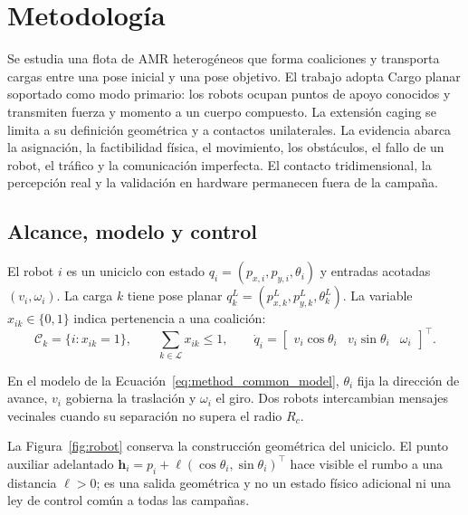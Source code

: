 \section{Metodología}
\label{sec:methodology}

Se estudia una flota de AMR heterogéneos que forma coaliciones y transporta
cargas entre una pose inicial y una pose objetivo. El trabajo adopta Cargo planar
soportado como modo primario: los robots ocupan puntos de apoyo conocidos y
transmiten fuerza y momento a un cuerpo compuesto. La extensión caging se limita
a su definición geométrica y a contactos unilaterales. La evidencia abarca la
asignación, la factibilidad física, el movimiento, los obstáculos, el fallo de un
robot, el tráfico y la comunicación imperfecta. El contacto tridimensional, la
percepción real y la validación en hardware permanecen fuera de la campaña.

\subsection{Alcance, modelo y control}
\label{sec:method_model_scope}

El robot \(i\) es un uniciclo con estado
\(q_i=(p_{x,i},p_{y,i},\theta_i)\) y entradas acotadas
\((v_i,\omega_i)\). La carga \(k\) tiene pose planar
\(q_k^L=(p_{x,k}^L,p_{y,k}^L,\theta_k^L)\). La variable
\(x_{ik}\in\{0,1\}\) indica pertenencia a una coalición:
\begin{equation}
    \mathcal C_k=\{i:x_{ik}=1\},\qquad
    \sum_{k\in\mathcal L}x_{ik}\leq1,\qquad
    \dot q_i=
    \begin{bmatrix}
        v_i\cos\theta_i & v_i\sin\theta_i & \omega_i
    \end{bmatrix}^{\!\top}.
    \label{eq:method_common_model}
\end{equation}

En el modelo de la Ecuación~\eqref{eq:method_common_model}, \(\theta_i\) fija la dirección de avance, \(v_i\) gobierna la
traslación y \(\omega_i\) el giro. Dos robots intercambian mensajes vecinales
cuando su separación no supera el radio \(R_c\).

La Figura~\ref{fig:robot} conserva la construcción geométrica del uniciclo. El
punto auxiliar adelantado
\(\boldsymbol h_i=p_i+\ell(\cos\theta_i,\sin\theta_i)^\top\) hace visible el
rumbo a una distancia \(\ell>0\); es una salida geométrica y no un estado físico
adicional ni una ley de control común a todas las campañas.



